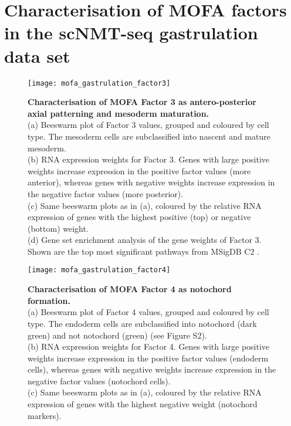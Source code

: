 \graphicspath{{Appendix/appendix_figures/}}

\chapter{Characterisation of MOFA factors in the scNMT-seq gastrulation data set} \label{appendix:mofa_gastrulation}

\begin{figure}[H]
	\centering
	\texttt{[image: mofa\_gastrulation\_factor3]}
	\caption[]{\textbf{Characterisation of MOFA Factor 3 as antero-posterior axial patterning and mesoderm maturation.} \\
	(a) Beeswarm plot of Factor 3 values, grouped and coloured by cell type. The mesoderm cells are subclassified into nascent and mature mesoderm. \\
	(b) RNA expression weights for Factor 3. Genes with large positive weights increase expression in the positive factor values (more anterior), whereas genes with negative weights increase expression in the negative factor values (more posterior).\\
	(c) Same beeswarm plots as in (a), coloured by the relative RNA expression of genes with the highest positive (top) or negative (bottom) weight.\\
	(d) Gene set enrichment analysis of the gene weights of Factor 3. Shown are the top most significant pathways from MSigDB C2 \cite{Subramanian2005,Ashburner2000}.
	}
	\label{fig:mofa_gastrulation_factor3}
\end{figure}


\begin{figure}[H]
	\centering
	\texttt{[image: mofa\_gastrulation\_factor4]}
	\caption[]{\textbf{Characterisation of MOFA Factor 4 as notochord formation.} \\
		(a) Beeswarm plot of Factor 4 values, grouped and coloured by cell type. The endoderm cells are subclassified into notochord (dark green) and not notochord (green) (see Figure S2). \\
		(b) RNA expression weights for Factor 4. Genes with large positive weights increase expression in the positive factor values (endoderm cells), whereas genes with negative weights increase expression in the negative factor values (notochord cells).\\
		(c) Same beeswarm plots as in (a), coloured by the relative RNA expression of genes with the highest negative weight (notochord markers).
	}
	\label{fig:mofa_gastrulation_factor4}
\end{figure}


